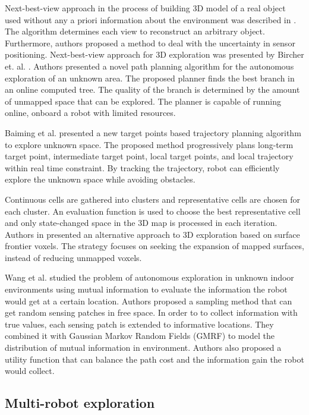 Next-best-view approach in the process of building 3D model of a real object used without any a priori information about the environment was described in \cite{VasquezGomez2014}. The algorithm determines each view to reconstruct an arbitrary object. Furthermore, authors proposed a method to deal with the uncertainty in sensor positioning.
Next-best-view approach for 3D exploration was presented by Bircher et. al. \cite{Bircher2016}. Authors presented a novel path planning algorithm for the autonomous exploration of an unknown area. The proposed planner finds the best branch in an online computed tree. The quality of the branch is determined by the amount of unmapped space that can be explored. The planner is capable of running online, onboard a robot with limited resources.

Baiming et al. \cite{Baiming2018} presented a new target points based trajectory planning algorithm to explore unknown space. The proposed method progressively plans long-term target point, intermediate target point, local target points, and local trajectory within real time constraint. By tracking the trajectory, robot can efficiently explore the unknown space while avoiding obstacles.

Continuous cells are gathered into clusters and representative cells are chosen for each cluster. An evaluation function is used to choose the best representative cell and only state-changed space in the 3D map is processed in each iteration.
Authors in \cite{Senarathne2016} presented an alternative approach to 3D exploration based on surface frontier voxels. The strategy focuses on seeking the expansion of mapped surfaces, instead of reducing unmapped voxels. 

Wang et al. \cite{Wang2018} studied the problem of autonomous exploration in unknown indoor environments using mutual information to evaluate the information the robot would get at a certain location. Authors proposed a sampling method that can get random sensing patches in free space. In order to to collect information with true values, each sensing patch is extended to informative locations. They combined it with Gaussian Markov Random Fields (GMRF) to model the distribution of mutual information in environment.  Authors also proposed a utility function that can balance the path cost and the information gain the robot would collect.


\subsection{Multi-robot exploration}

